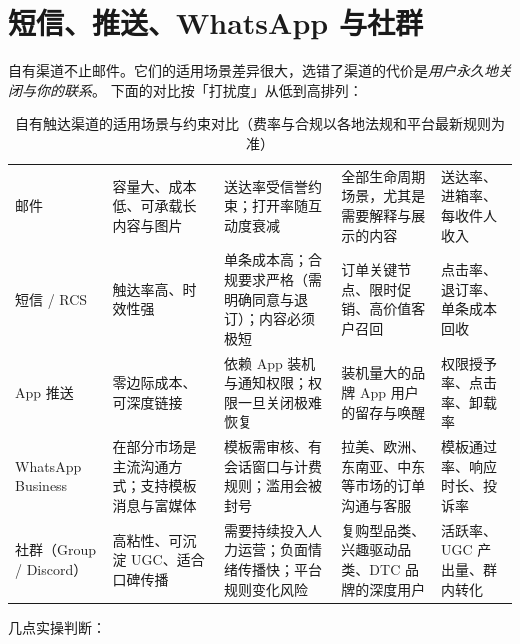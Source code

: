 \section{短信、推送、WhatsApp 与社群}
\label{sec:cro-owned}

自有渠道不止邮件。它们的适用场景差异很大，选错了渠道的代价是\emph{用户永久地关闭与你的联系}。
下面的对比按「打扰度」从低到高排列：

\begin{table}[htbp]
\centering
\caption{自有触达渠道的适用场景与约束对比（费率与合规以各地法规和平台最新规则为准）}
\label{tab:owned-channels}
\small
\begin{tabularx}{\textwidth}{L{1.7cm} L{2.4cm} L{3.0cm} L{3.0cm} Y}
\toprule
{} &  &  &  &  \\
\midrule
邮件 & 容量大、成本低、可承载长内容与图片 & 送达率受信誉约束；打开率随互动度衰减 & 全部生命周期场景，尤其是需要解释与展示的内容 & 送达率、进箱率、每收件人收入 \\
\addlinespace
短信 / RCS & 触达率高、时效性强 & 单条成本高；合规要求严格（需明确同意与退订）；内容必须极短 & 订单关键节点、限时促销、高价值客户召回 & 点击率、退订率、单条成本回收 \\
\addlinespace
App 推送 & 零边际成本、可深度链接 & 依赖 App 装机与通知权限；权限一旦关闭极难恢复 & 装机量大的品牌 App 用户的留存与唤醒 & 权限授予率、点击率、卸载率 \\
\addlinespace
WhatsApp Business & 在部分市场是主流沟通方式；支持模板消息与富媒体 & 模板需审核、有会话窗口与计费规则；滥用会被封号 & 拉美、欧洲、东南亚、中东等市场的订单沟通与客服 & 模板通过率、响应时长、投诉率 \\
\addlinespace
社群（Group / Discord） & 高粘性、可沉淀 UGC、适合口碑传播 & 需要持续投入人力运营；负面情绪传播快；平台规则变化风险 & 复购型品类、兴趣驱动品类、DTC 品牌的深度用户 & 活跃率、UGC 产出量、群内转化 \\
\bottomrule
\end{tabularx}
\end{table}

几点实操判断：

